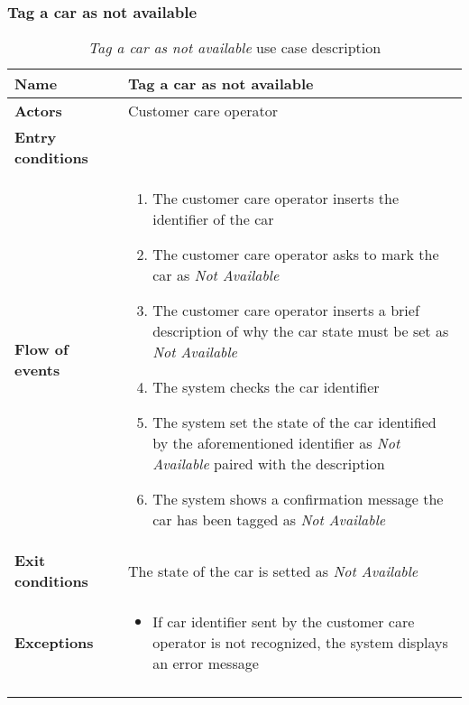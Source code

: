 \subsubsection{Tag a car as not available}
\begin{longtable}{p{0.25\linewidth}p{0.75\linewidth}}
\toprule
\textbf{Name} & \textbf{Tag a car as not available} \\
\midrule
\textbf{Actors} &  Customer care operator\\
\midrule
\textbf{Entry conditions} & \\
\midrule
\textbf{Flow of events} & 
\begin{enumerate}
	\item The customer care operator inserts the identifier of the car
	\item The customer care operator asks to mark the car as \emph{Not Available}
	\item The customer care operator inserts a brief description of why the car state must be set as \emph{Not Available}
	\item The system checks the car identifier
	\item The system set the state of the car identified by the aforementioned identifier as \emph{Not Available} paired with the description
	\item The system shows a confirmation message the car has been tagged as \emph{Not Available}
\end{enumerate} \\
\midrule
\textbf{Exit conditions} & The state of the car is setted as \emph{Not Available}\\
\midrule
\textbf{Exceptions} & 
\begin{itemize}
	\item If car identifier sent by the customer care operator is not recognized, the system displays an error message
\end{itemize} \\
\bottomrule
\caption{\emph{Tag a car as not available} use case description}
\end{longtable}